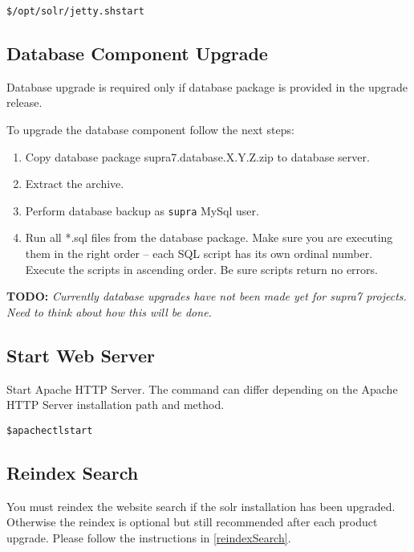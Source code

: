 \documentclass[12pt]{article}
\newcommand{\vigShowNotes}{1}
\newcommand{\vigPackageName}{supra7}
\newcommand{\vigReleaseVersion}{X.Y.Z}
\newcommand{\todo}[1]{
\textbf{TODO:} 
\textit{#1}
}
\begin{document}
\begin{alltt}
\$ /opt/solr/jetty.sh start
\end{alltt}

\subsection{Database Component Upgrade}

Database upgrade is required only if database package is provided in the upgrade release.

To upgrade the database component follow the next steps:

\begin{enumerate}
	\item Copy database package {\vigPackageName}.database.\vigReleaseVersion.zip to database server.
	\item Extract the archive.
	\item Perform database backup as \texttt{supra} MySql user.
	\item Run all *.sql files from the database package. Make sure you are executing them in the right order -- each SQL script has its own ordinal number. Execute the scripts in ascending order. Be sure scripts return no errors.
\end{enumerate}

\todo{Currently database upgrades have not been made yet for supra7 projects. Need to think about how this will be done.}

\subsection{Start Web Server}
Start Apache HTTP Server. The command can differ depending on the Apache HTTP Server installation path and method.

\begin{alltt}
\$ apachectl start
\end{alltt}

\subsection{Reindex Search}

You must reindex the website search if the solr installation has been upgraded. Otherwise the reindex is optional but still recommended after each product upgrade. Please follow the instructions in \ref{reindexSearch}.
\end{document}
